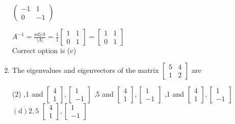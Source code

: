 \begin{enumerate}[label=\color{ocre}\textbf{\arabic*.}]
\begin{tasks}
	\task[\textbf{d.}]$\left(\begin{array}{cc}-1 & 1 \\ 0 & -1\end{array}\right)$ 
\end{tasks}
\begin{answer}
$A^{-1}=\frac{a d j A}{|A|}=\frac{1}{1}\left[\begin{array}{ll}1 & 1 \\ 0 & 1\end{array}\right]=\left[\begin{array}{ll}1 & 1 \\ 0 & 1\end{array}\right]$
\\Correct option is (c)	
\end{answer}
\item The eigenvalues and eigenvectors of the matrix $\left[\begin{array}{ll}5 & 4 \\ 1 & 2\end{array}\right]$ are
\begin{tasks}(2)
	,1 and $\left[\begin{array}{c}4 \\ 1\end{array}\right],\left[\begin{array}{c}1 \\ -1\end{array}\right]$  
	,5 and $\left[\begin{array}{c}4 \\ 1\end{array}\right],\left[\begin{array}{c}1 \\ -1\end{array}\right]$
	,1 and $\left[\begin{array}{c}4 \\ 1\end{array}\right],\left[\begin{array}{c}1 \\ -1\end{array}\right]$
	\task[\textbf{d.}]$(\mathrm{d}) 2,5$ $\left[\begin{array}{c}4 \\ 1\end{array}\right],\left[\begin{array}{c}1 \\ -1\end{array}\right]$ 

\end{tasks}
\end{enumerate}
